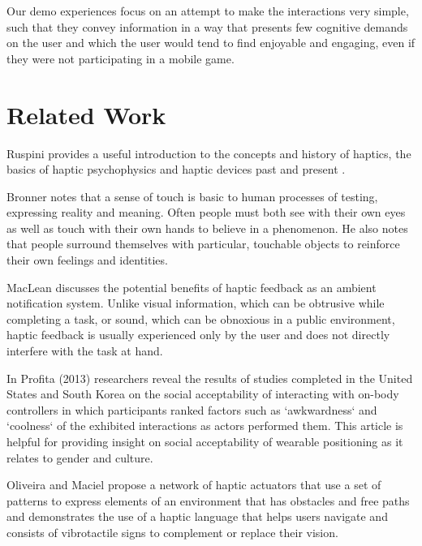 \documentclass{chi-ext}
\begin{document}
Our demo experiences focus on an attempt to make the interactions very simple, such that they convey information in a way that presents few cognitive demands on the user and which the user would tend to find enjoyable and engaging, even if they were not participating in a mobile game. 


\section{Related Work}

Ruspini provides a useful introduction to the concepts and history of haptics, the basics of haptic psychophysics and haptic devices past and present \cite{ruspini1999haptics}.

Bronner notes that a sense of touch is basic to human processes of testing, expressing reality and meaning. Often people must both see with their own eyes as well as touch with their own hands to believe in a phenomenon\cite{bronner1982haptic}. He also notes that people surround themselves with particular, touchable objects to reinforce their own feelings and identities. 

MacLean \cite{maclean2009putting} discusses the potential benefits of haptic feedback as an ambient notification system. Unlike visual information, which can be obtrusive while completing a task, or sound, which can be obnoxious in a public environment, haptic feedback is usually experienced only by the user and does not directly interfere with the task at hand. 

In Profita (2013) \cite{profita2013don} researchers reveal the results of studies completed in the United States and South Korea on the social acceptability of interacting with on-body controllers in which participants  ranked factors such as `awkwardness` and `coolness` of the exhibited interactions as actors performed them. This article is helpful for providing insight on social acceptability of wearable positioning as it relates to gender and culture.

Oliveira and Maciel propose a network of haptic actuators that use a set of patterns to express elements of an environment that has obstacles and free paths and demonstrates the use of a haptic language that helps users navigate and consists of vibrotactile signs to complement or replace their vision. \cite{Jesus-Oliveira:2013aa}
\end{document}

